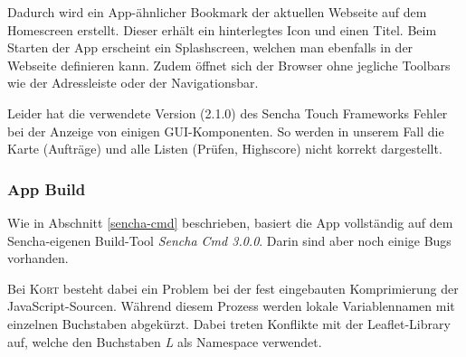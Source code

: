 Dadurch wird ein App-ähnlicher Bookmark der aktuellen Webseite auf dem Homescreen erstellt.
Dieser erhält ein hinterlegtes Icon und einen Titel.
Beim Starten der App erscheint ein Splashscreen, welchen man ebenfalls in der Webseite definieren kann. Zudem öffnet sich der Browser ohne jegliche Toolbars wie der Adressleiste oder der Navigationsbar.

Leider hat die verwendete Version (2.1.0) des Sencha Touch Frameworks Fehler bei der Anzeige von einigen GUI-Komponenten.
So werden in unserem Fall die Karte (Aufträge) und alle Listen (Prüfen, Highscore) nicht korrekt dargestellt.

\subsubsection{App Build}
Wie in Abschnitt \ref{sencha-cmd} beschrieben, basiert die App vollständig auf dem Sencha-eigenen Build-Tool \emph{Sencha Cmd 3.0.0}. Darin sind aber noch einige Bugs vorhanden.

Bei \textsc{Kort} besteht dabei ein Problem bei der fest eingebauten Komprimierung der JavaScript-Sourcen.
Während diesem Prozess werden lokale Variablennamen mit einzelnen Buchstaben abgekürzt.
Dabei treten Konflikte mit der Leaflet-Library auf, welche den Buchstaben \emph{L} als Namespace verwendet. 